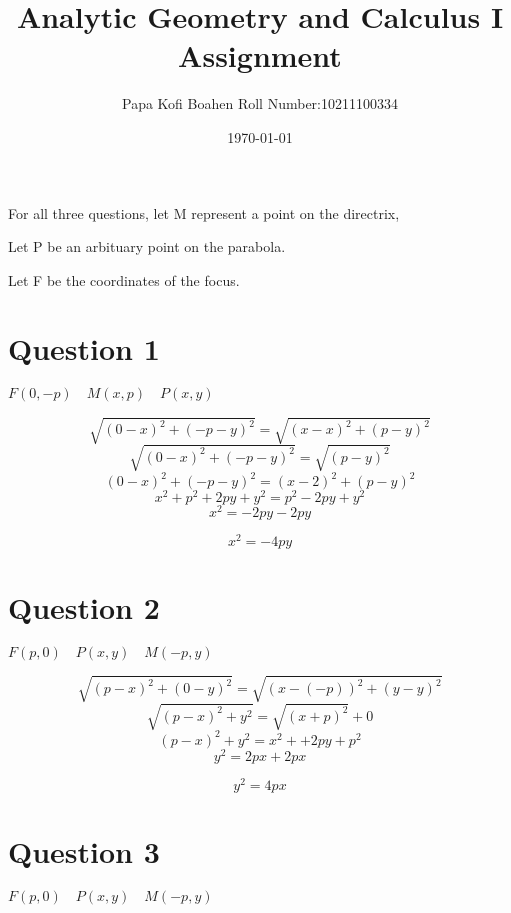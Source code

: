 \documentclass[16pt]{article}
\title{\huge{Analytic Geometry and Calculus I Assignment}}
\author{\huge{Papa Kofi Boahen Roll Number:10211100334}}
\date{\today}
\begin{document}
    
\begin{huge}
	\maketitle
	
	For all three questions, let M represent a point on the directrix, 
	
	Let P be an arbituary point on the parabola. 
	
	Let F be the coordinates of the focus. 
\end{huge}
	
\section{Question 1}
\begin{huge} \begin{math}
F(0, -p)  \quad M(x, p)  \quad  P(x, y)
\end{math} \end{huge}

\begin{huge}
\[ \sqrt{(0-x)^2 + (-p-y)^2} = \sqrt{(x-x)^2 + (p-y)^2}\]
\[ \sqrt{(0-x)^2 + (-p-y)^2} = \sqrt{(p-y)^2}\]
\[ (0-x)^2 + (-p-y)^2 = (x-2)^2 + (p-y)^2 \]
\[	x^2 + p^2 + 2py + y^2 = p^2 - 2py + y^2 \]
\[  x^2  = -2py - 2py \]

\[ x^2 = -4py\] 
\end{huge}

\section{Question 2}
 \begin{huge} \begin{math} F(p, 0)  \quad   P(x,y)   \quad  M(-p,y) \end{math} 
 \end{huge}

\begin{huge}
	\[ \sqrt{(p-x)^2 + (0-y)^2} = \sqrt{(x-(-p))^2 + (y-y)^2}\]
	\[ \sqrt{(p-x)^2 + y^2} = \sqrt{(x+p)^2} + 0\]
	\[ (p-x)^2 + y^2 = x^2 + +2py + p^2 \]
	\[	 y^2 = 2px + 2px \]
	
	\[  y^2 = 4px\]
\end{huge}


\section{Question 3}
 \begin{huge} \begin{math} F(p, 0)  \quad   P(x,y)   \quad  M(-p,y) \end{math} 
\end{huge}
\end{document}
